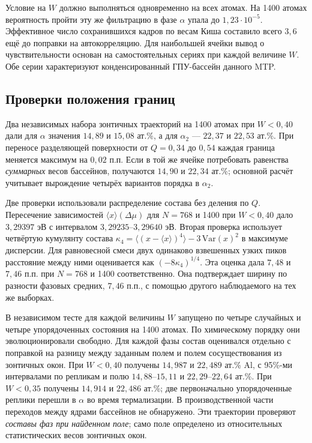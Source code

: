 Условие на $W$ должно выполняться одновременно на всех атомах.
На 1400 атомах вероятность пройти эту же фильтрацию в фазе $\alpha$
упала до $1{,}23\cdot10^{-5}$. Эффективное число сохранившихся
кадров по весам Киша составило всего $3{,}6$ ещё до поправки на
автокорреляцию. Для наибольшей ячейки вывод о чувствительности
основан на самостоятельных сериях при каждой величине $W$.
Обе серии характеризуют конденсированный ГПУ-бассейн данного MTP.

\subsection{Проверки положения границ}

Два независимых набора зонтичных траекторий на 1400 атомах при
$W<0{,}40$ дали для $\alpha$ значения $14{,}89$ и $15{,}08$
ат.\%, а для $\alpha_2$ --- $22{,}37$ и $22{,}53$ ат.\%.
При переносе разделяющей поверхности от $Q=0{,}34$ до $0{,}54$
каждая граница меняется максимум на $0{,}02$ п.п. Если в той же
ячейке потребовать равенства \emph{суммарных} весов бассейнов,
получаются $14{,}90$ и $22{,}34$ ат.\%; основной расчёт учитывает
вырождение четырёх вариантов порядка в $\alpha_2$.

Две проверки использовали распределение состава без деления по $Q$.
Пересечение зависимостей $\langle x\rangle(\Delta\mu)$ для
$N=768$ и 1400 при $W<0{,}40$ дало
$3{,}29397$ эВ с интервалом $3{,}29235$--$3{,}29640$ эВ.
Вторая проверка использует четвёртую кумулянту состава
$\kappa_4=\langle(x-\langle x\rangle)^4\rangle-
3\,\mathrm{Var}(x)^2$ в максимуме дисперсии. Для равновесной смеси
двух одинаково взвешенных узких пиков расстояние между ними
оценивается как $(-8\kappa_4)^{1/4}$. Эта оценка дала
$7{,}48$ и $7{,}46$ п.п. при $N=768$ и 1400 соответственно.
Она подтверждает ширину по разности фазовых средних, $7{,}46$ п.п.,
с помощью другого наблюдаемого на тех же выборках.

В независимом тесте для каждой величины $W$ запущено по четыре
случайных и четыре упорядоченных состояния на 1400 атомах.
По химическому порядку они эволюционировали свободно. Для каждой
фазы состав оценивался отдельно с поправкой на разницу между
заданным полем и полем сосуществования из зонтичных окон.
При $W<0{,}40$ получены $14{,}987$ и $22{,}489$ ат.\% Al,
с 95\%-ми интервалами по репликам и полю $14{,}88$--$15{,}11$
и $22{,}29$--$22{,}64$ ат.\%. При $W<0{,}35$ получены
$14{,}914$ и $22{,}486$ ат.\%; две первоначально упорядоченные
реплики перешли в $\alpha$ во время термализации. В производственной
части переходов между ядрами бассейнов не обнаружено.
Эти траектории проверяют \emph{составы фаз при найденном поле};
само поле определено из относительных статистических весов зонтичных
окон.


